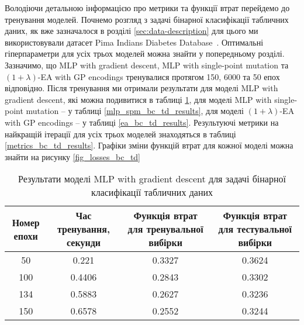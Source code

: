 Володіючи детальною інформацією про метрики та функції втрат перейдемо до тренування моделей. Почнемо розгляд з задачі бінарної класифікації табличних даних, як вже зазначалося в розділі \ref{sec:data-description} для цього ми використовували датасет Pima Indians Diabetes Database~\cite{ct30}. Оптимальні гіперпараметри для усіх трьох моделей можна знайти у попередньому розділі. Зазначимо, що MLP with gradient descent, MLP with single-point mutation та $(1+\lambda)$-EA with GP encodings тренувалися протягом 150, 6000 та 50 епох відповідно. Після тренування ми отримали результати для моделі MLP with gradient descent, які можна подивитися в таблиці \ref{mlp_gd_bc_td_results}, для моделі MLP with single-point mutation -- у таблиці \ref{mlp_spm_bc_td_results}, для моделі $(1+\lambda)$-EA with GP encodings -- у таблиці \ref{ea_bc_td_results}. Результуючі метрики на найкращій ітерації для усіх трьох моделей знаходяться в таблиці \ref{metrics_bc_td_results}. Графіки зміни функцій втрат для кожної моделі можна знайти на рисунку \ref{fig_losses_bc_td}

\begin{table}[ht]
	\centering
	\begin{adjustbox}{max width=\textwidth}
		\begin{tabular}{|c|c|c|c|}
			\hline 
			Номер епохи & Час тренування, секунди & Функція втрат для тренувальної вибірки & Функція втрат для тестувальної вибірки \\
			\hline 
			50 & 0.221 & 0.3327 & 0.3624 \\
			\hline 
			100 & 0.4406 & 0.2843 & 0.3302 \\
			\hline
			134 & 0.5883 & 0.2627 & 0.3236 \\
			\hline
			150 & 0.6578 & 0.2552 & 0.3244 \\
			\hline
		\end{tabular}
	\end{adjustbox}
	\caption{Результати моделі MLP with gradient descent для задачі бінарної класифікації табличних даних}
	\label{mlp_gd_bc_td_results}
\end{table}

